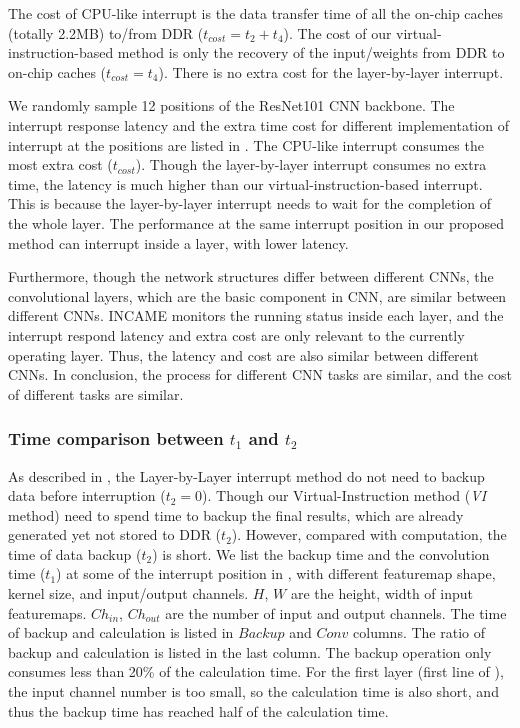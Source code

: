 The cost of CPU-like interrupt is the data transfer time of all the on-chip caches (totally 2.2MB) to/from DDR ($t_{cost} = t_2+t_4$). The cost of our virtual-instruction-based method is only the recovery of the input/weights from DDR to on-chip caches ($t_{cost} = t_4$). There is no extra cost for the layer-by-layer interrupt.



We randomly sample 12 positions of the ResNet101 CNN backbone. The interrupt response latency and the extra time cost for different implementation of interrupt at the positions are listed in .
The CPU-like interrupt consumes the most extra cost ($t_{cost}$). Though the layer-by-layer interrupt consumes no extra time, the latency is much higher than our virtual-instruction-based interrupt. 
This is because the layer-by-layer interrupt needs to wait for the completion of the whole layer. The performance at the same interrupt position in our proposed method can interrupt inside a layer, with lower latency.

Furthermore, though the network structures differ between different CNNs, the convolutional layers, which are the basic component in CNN, are similar between different CNNs. 
INCAME monitors the running status inside each layer, and the interrupt respond latency and extra cost are only relevant to the currently operating layer. Thus, the latency and cost are also similar between different CNNs. In conclusion, the process for different CNN tasks are similar, and the cost of different tasks are similar.

\subsubsection{ Time comparison between $t_1$ and $t_2$ }
\label{sec:expt1t2}
As described in , the Layer-by-Layer interrupt method do not need to backup data before interruption ($t_2 = 0$). Though our Virtual-Instruction method (\textit{VI} method) need to spend time to backup the final results, which are already generated yet not stored to DDR ($t_2$). However, compared with computation, the time of data backup ($t_2$) is short. We list the backup time and the convolution time ($t_1$) at some of the interrupt position in , with different featuremap shape, kernel size, and input/output channels. $H$, $W$ are the height, width of input featuremaps. $Ch_{in}$, $Ch_{out}$ are the number of input and output channels. The time of backup and calculation is listed in $Backup$ and $Conv$ columns. The ratio of backup and calculation is listed in the last column. The backup operation only consumes less than 20\% of the calculation time. For the first layer (first line of ), the input channel number is too small, so the calculation time is also short, and thus the backup time has reached half of the calculation time. 

